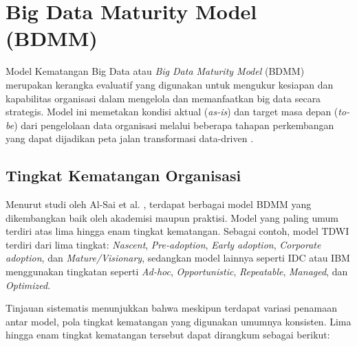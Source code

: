 \section{Big Data Maturity Model (BDMM)}

Model Kematangan Big Data atau \textit{Big Data Maturity Model} (BDMM) merupakan kerangka evaluatif yang digunakan untuk mengukur kesiapan dan kapabilitas organisasi dalam mengelola dan memanfaatkan big data secara strategis. Model ini memetakan kondisi aktual (\textit{as-is}) dan target masa depan (\textit{to-be}) dari pengelolaan data organisasi melalui beberapa tahapan perkembangan yang dapat dijadikan peta jalan transformasi data-driven \cite{alsai2023}.

\subsection{Tingkat Kematangan Organisasi}

Menurut studi oleh Al-Sai et al. \cite{alsai2023}, terdapat berbagai model BDMM yang dikembangkan baik oleh akademisi maupun praktisi. Model yang paling umum terdiri atas lima hingga enam tingkat kematangan. Sebagai contoh, model TDWI terdiri dari lima tingkat: \textit{Nascent}, \textit{Pre-adoption}, \textit{Early adoption}, \textit{Corporate adoption}, dan \textit{Mature/Visionary}, sedangkan model lainnya seperti IDC atau IBM menggunakan tingkatan seperti \textit{Ad-hoc}, \textit{Opportunistic}, \textit{Repeatable}, \textit{Managed}, dan \textit{Optimized}.

Tinjauan sistematis menunjukkan bahwa meskipun terdapat variasi penamaan antar model, pola tingkat kematangan yang digunakan umumnya konsisten. Lima hingga enam tingkat kematangan tersebut dapat dirangkum sebagai berikut:

